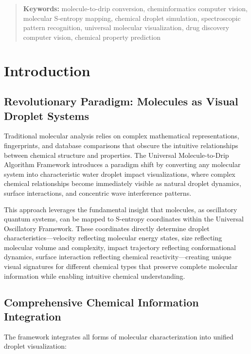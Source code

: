 \documentclass[12pt,a4paper]{article}
\begin{document}
\begin{abstract}
\textbf{Keywords:} molecule-to-drip conversion, cheminformatics computer vision, molecular S-entropy mapping, chemical droplet simulation, spectroscopic pattern recognition, universal molecular visualization, drug discovery computer vision, chemical property prediction
\end{abstract}

\section{Introduction}

\subsection{Revolutionary Paradigm: Molecules as Visual Droplet Systems}

Traditional molecular analysis relies on complex mathematical representations, fingerprints, and database comparisons that obscure the intuitive relationships between chemical structure and properties. The Universal Molecule-to-Drip Algorithm Framework introduces a paradigm shift by converting any molecular system into characteristic water droplet impact visualizations, where complex chemical relationships become immediately visible as natural droplet dynamics, surface interactions, and concentric wave interference patterns.

This approach leverages the fundamental insight that molecules, as oscillatory quantum systems, can be mapped to S-entropy coordinates within the Universal Oscillatory Framework. These coordinates directly determine droplet characteristics—velocity reflecting molecular energy states, size reflecting molecular volume and complexity, impact trajectory reflecting conformational dynamics, surface interaction reflecting chemical reactivity—creating unique visual signatures for different chemical types that preserve complete molecular information while enabling intuitive chemical understanding.

\subsection{Comprehensive Chemical Information Integration}

The framework integrates all forms of molecular characterization into unified droplet visualization:
\end{document}
